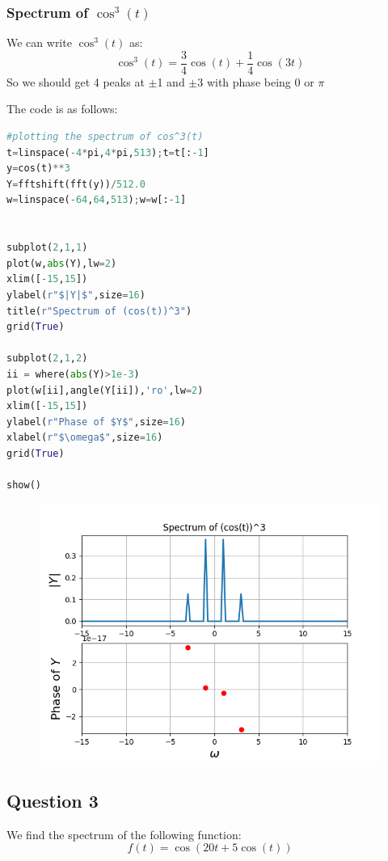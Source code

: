 \documentclass[11pt, a4paper]{article}
\begin{document}
\subsubsection{Spectrum of $\cos^3(t)$}
We can write $\cos^3(t)$ as:
\begin{equation*}
    \cos^3(t) = \frac{3}{4}\cos(t) + \frac{1}{4}\cos(3t)
\end{equation*}
So we should get 4 peaks at $\pm$1 and $\pm$3 with phase being 0 or $\pi$

The code is as follows:
\begin{lstlisting}[language = Python]
#plotting the spectrum of cos^3(t)
t=linspace(-4*pi,4*pi,513);t=t[:-1]
y=cos(t)**3
Y=fftshift(fft(y))/512.0
w=linspace(-64,64,513);w=w[:-1]


subplot(2,1,1)
plot(w,abs(Y),lw=2)
xlim([-15,15])
ylabel(r"$|Y|$",size=16)
title(r"Spectrum of (cos(t))^3")
grid(True)

subplot(2,1,2)
ii = where(abs(Y)>1e-3)
plot(w[ii],angle(Y[ii]),'ro',lw=2)
xlim([-15,15])
ylabel(r"Phase of $Y$",size=16)
xlabel(r"$\omega$",size=16)
grid(True)

show()
\end{lstlisting}

\begin{figure}[H]
    \centering
    \includegraphics[scale = 0.8]{Figure_6.png}
\end{figure}

\subsection{Question 3}
We find the spectrum of the following function:
\[f(t) = \cos(20t + 5\cos(t))\]
\end{document}
